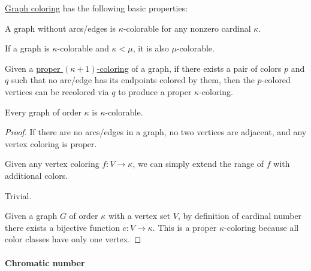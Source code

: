 \begin{proposition}\label{thm:def:graph_coloring}
  \hyperref[def:multipartite_graph]{Graph coloring} has the following basic properties:
  \begin{thmenum}
     A graph without arcs/edges is \( \kappa \)-colorable for any nonzero cardinal \( \kappa \).

     If a graph is \( \kappa \)-colorable and \( \kappa < \mu \), it is also \( \mu \)-colorable.

     Given a \hyperref[def:graph_coloring/proper]{proper \( (\kappa + 1) \)-coloring} of a graph, if there exists a pair of colors \( p \) and \( q \) such that no arc/edge has its endpoints colored by them, then the \( p \)-colored vertices can be recolored via \( q \) to produce a proper \( \kappa \)-coloring.

     Every graph of order \( \kappa \) is \( \kappa \)-colorable.
  \end{thmenum}
\end{proposition}
\begin{proof}
   If there are no arcs/edges in a graph, no two vertices are adjacent, and any vertex coloring is proper.

   Given any vertex coloring \( f: V \to \kappa \), we can simply extend the range of \( f \) with additional colors.

   Trivial.

   Given a graph \( G \) of order \( \kappa \) with a vertex set \( V \), by definition of cardinal number there exists a bijective function \( c: V \to \kappa \). This is a proper \( \kappa \)-coloring because all color classes have only one vertex.
\end{proof}

\paragraph{Chromatic number}

